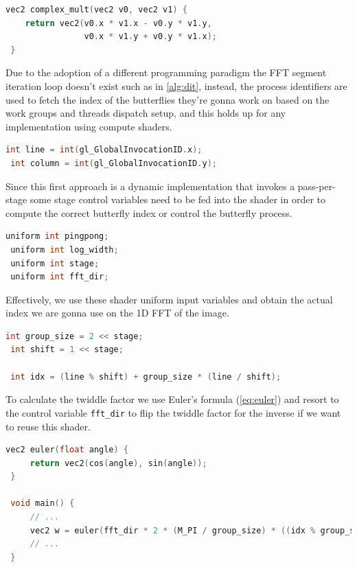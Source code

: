 \documentclass[
  oneside,
  11pt, a4paper,
  footinclude=true,
  headinclude=true,
  cleardoublepage=empty
]{scrbook}
\begin{document}
\begin{lstlisting}[language=C, caption={Complex multiplication}]
 vec2 complex_mult(vec2 v0, vec2 v1) {
 	return vec2(v0.x * v1.x - v0.y * v1.y,
 				v0.x * v1.y + v0.y * v1.x);
 }
\end{lstlisting}

Due to the adoption of a different programming paradigm the FFT segment iteration loop doesn't exist such as in \autoref{alg:dit}, instead, the process identifiers are used to fetch the index of the butterflies they're gonna work on based on the work groups and threads dispatch setup, and this holds up for any implementation using compute shaders.

\begin{lstlisting}[language=C, caption={Invocation indices}]
 int line = int(gl_GlobalInvocationID.x);
 int column = int(gl_GlobalInvocationID.y);
\end{lstlisting}

Since this first approach is a dynamic implementation that invokes a pass-per-stage some stage control variables need to be fed into the shader in order to compute the correct butterfly index or control the butterfly process.

\begin{lstlisting}[language=C, caption={Uniform control variables}]
 uniform int pingpong;
 uniform int log_width;
 uniform int stage;
 uniform int fft_dir;
\end{lstlisting}

Effectively, we use these shader uniform input variables and obtain the actual index we are gonna use on the 1D FFT of the image.

\begin{lstlisting}[language=C, caption={FFT element index}]
 int group_size = 2 << stage;
 int shift = 1 << stage;
 
 int idx = (line % shift) + group_size * (line / shift);
\end{lstlisting}

To calculate the twiddle factor we use Euler's formula (\autoref{eq:euler}) and resort to the control variable \texttt{fft\_dir} to flip the twiddle factor for the inverse if we want to reuse this shader.

\begin{lstlisting}[language=C,caption={Euler's formula}]
 vec2 euler(float angle) {
     return vec2(cos(angle), sin(angle));
 }
 
 void main() {
     // ...
     vec2 w = euler(fft_dir * 2 * (M_PI / group_size) * ((idx % group_size) % shift));
     // ...
 }
\end{lstlisting}
\end{document}
